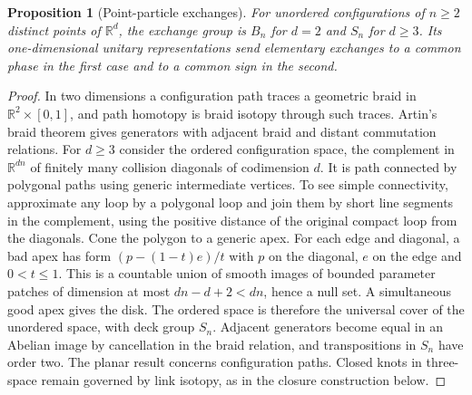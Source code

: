 \documentclass[aps,pra,onecolumn,superscriptaddress,nofootinbib,10pt]{revtex4-2}
\newtheorem{proposition}[theorem]{Proposition}
\theoremstyle{definition}
\theoremstyle{remark}
\begin{document}
\begin{proposition}[Point-particle exchanges]\label{cp:exchange}
For unordered configurations of $n\ge2$ distinct points of $\mathbb R^d$, the exchange group is $B_n$ for $d=2$ and $S_n$ for $d\ge3$. Its one-dimensional unitary representations send elementary exchanges to a common phase in the first case and to a common sign in the second. \cite{n5-artin,n5-lm}
\end{proposition}
\begin{proof}
In two dimensions a configuration path traces a geometric braid in $\mathbb R^2\times[0,1]$, and path homotopy is braid isotopy through such traces. Artin's braid theorem gives generators with adjacent braid and distant commutation relations. For $d\ge3$ consider the ordered configuration space, the complement in $\mathbb R^{dn}$ of finitely many collision diagonals of codimension $d$. It is path connected by polygonal paths using generic intermediate vertices. To see simple connectivity, approximate any loop by a polygonal loop and join them by short line segments in the complement, using the positive distance of the original compact loop from the diagonals. Cone the polygon to a generic apex. For each edge and diagonal, a bad apex has form $(p-(1-t)e)/t$ with $p$ on the diagonal, $e$ on the edge and $0<t\le1$. This is a countable union of smooth images of bounded parameter patches of dimension at most $dn-d+2<dn$, hence a null set. A simultaneous good apex gives the disk. The ordered space is therefore the universal cover of the unordered space, with deck group $S_n$. Adjacent generators become equal in an Abelian image by cancellation in the braid relation, and transpositions in $S_n$ have order two. The planar result concerns configuration paths. Closed knots in three-space remain governed by link isotopy, as in the closure construction below.
\end{proof}
\end{document}
